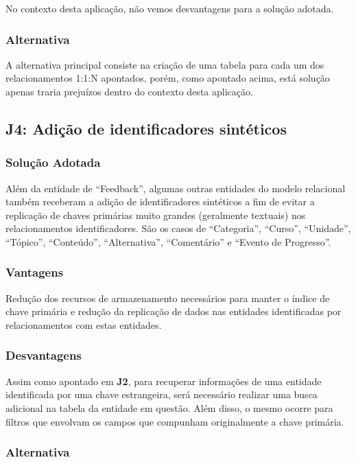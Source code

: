 No contexto desta aplicação, não vemos desvantagens para a solução adotada.

\subsubsection{Alternativa}

A alternativa principal consiste na criação de uma tabela para cada um dos
relacionamentos 1:1:N apontados, porém, como apontado acima, está solução
apenas traria prejuízos dentro do contexto desta aplicação.

\subsection{\textbf{J4:} Adição de identificadores sintéticos}

\subsubsection{Solução Adotada}

Além da entidade de ``Feedback'', algumas outras entidades do modelo relacional
também receberam a adição de identificadores sintéticos a fim de evitar a
replicação de chaves primárias muito grandes (geralmente textuais) nos
relacionamentos identificadores. São os casos de ``Categoria'', ``Curso'',
``Unidade'', ``Tópico'', ``Conteúdo'', ``Alternativa'', ``Comentário'' e
``Evento de Progresso''.

\subsubsection{Vantagens}

Redução dos recursos de armazenamento necessários para manter o índice de chave
primária e redução da replicação de dados nas entidades identificadas por
relacionamentos com estas entidades.

\subsubsection{Desvantagens}

Assim como apontado em \textbf{J2}, para recuperar informações de uma entidade
identificada por uma chave estrangeira, será necessário realizar uma busca
adicional na tabela da entidade em questão. Além disso, o mesmo ocorre para
filtros que envolvam os campos que compunham originalmente a chave primária.

\subsubsection{Alternativa}

